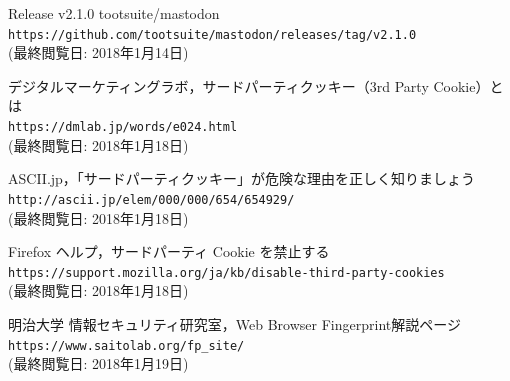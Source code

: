 \documentclass[10pt, a4paper]{jreport}
\begin{document}
\begin{thebibliography}{n}
 Release v2.1.0  tootsuite/mastodon\\
\verb|https://github.com/tootsuite/mastodon/releases/tag/v2.1.0|\\
(最終閲覧日: 2018年1月14日)

 デジタルマーケティングラボ，サードパーティクッキー（3rd Party Cookie）とは\\
\verb|https://dmlab.jp/words/e024.html|\\
(最終閲覧日: 2018年1月18日)

 ASCII.jp，「サードパーティクッキー」が危険な理由を正しく知りましょう\\
\verb|http://ascii.jp/elem/000/000/654/654929/|\\
(最終閲覧日: 2018年1月18日)

 Firefox ヘルプ，サードパーティ Cookie を禁止する\\
\verb|https://support.mozilla.org/ja/kb/disable-third-party-cookies|\\
(最終閲覧日: 2018年1月18日)

 明治大学 情報セキュリティ研究室，Web Browser Fingerprint解説ページ\\
\verb|https://www.saitolab.org/fp_site/|\\
(最終閲覧日: 2018年1月19日)

\end{thebibliography}

\end{document}
